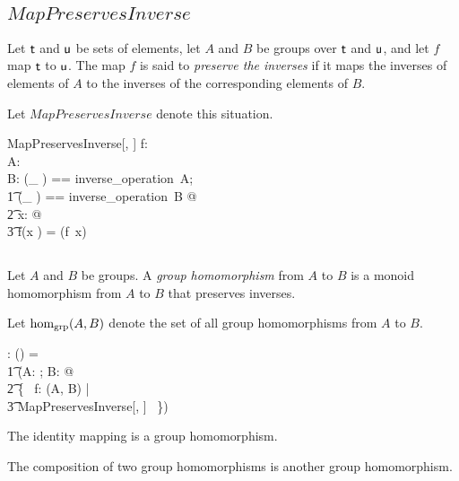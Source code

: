 \documentclass[11pt, oneside]{article}
\begin{document}
\subsection{$MapPreservesInverse$}

Let $\mathsf{t}$ and $\mathsf{u}$ be sets of elements,
let $A$ and $B$ be groups over $\mathsf{t}$ and $\mathsf{u}$, 
and let $f$ map $\mathsf{t}$ to $\mathsf{u}$.
The map $f$ is said to {\em preserve the inverses} if it maps the inverses of elements of $A$
to the inverses of the corresponding elements of $B$.

Let $MapPreservesInverse$ denote this situation.

\begin{schema}{MapPreservesInverse}[\genT, \genU]
f: \genT \fun \genU \\
A: \group \genT \\
B: \group \genU
\where
\LET (\_ \invG) == inverse\_operation~A; \\
\t1	(\_ \daggerG) == inverse\_operation~B @ \\
\t2		\forall x: \genT @ \\
\t3			f(x \invG) = (f~x) \daggerG
\end{schema}

\subsection{}

Let $A$ and $B$ be groups.
A {\em group homomorphism} from $A$ to $B$ is a monoid homomorphism
from $A$ to $B$ that preserves inverses.

Let $\operatorname{hom_{grp}}(A, B)$ denote the set of all group homomorphisms from $A$ to $B$.

\begin{gendef}[\genT, \genU]
\homGroup: \group \genT \cross \group \genU \fun \power (\genT \fun \genU)
\where
\homGroup = \\
\t1	(\lambda A: \group \genT; B: \group \genU @ \\
\t2		\{~ f: \homMonoid(A, B) | \\
\t3			MapPreservesInverse[\genT, \genU] ~\})
\end{gendef}

\begin{remark}
The identity mapping is a group homomorphism.
\end{remark}

\begin{remark}
The composition of two group homomorphisms is another group homomorphism.
\end{remark}
\end{document}

